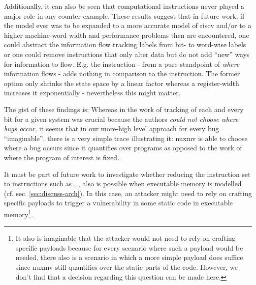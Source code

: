 Additionally, it can also be seen that computational instructions never played a major role in any counter-example.
These results suggest that in future work, if the model ever was to be expanded to a more accurate model of \gls{riscv} and/or to a higher machine-word width and performance problems then are encountered, one could abstract the information flow tracking labels from bit- to word-wise labels or one could remove instructions that only alter data but do not add \enquote{new} ways for information to flow.
E.g. the  instruction - from a pure standpoint of \textit{where} information flows - adds nothing in comparison to the  instruction.
The former option only shrinks the state space by a linear factor whereas a register-width increases it exponentially - nevertheless this might matter.

The gist of these findings is:
Whereas in the work of \citeauthor{Ferraiuolo17} \cite{Ferraiuolo17} tracking of each and every bit for a given system was crucial because the authors \textit{could not choose where bugs occur}, it seems that in our more-high level approach for every bug \enquote{imaginable}, there is a very simple trace illustrating it: \gls{nuxmv} is able to choose where a bug occurs since it quantifies over programs as opposed to the work of \citeauthor{Ferraiuolo17} where the program of interest is fixed.

It must be part of future work to investigate whether reducing the instruction set to instructions such as , ,  also is possible when executable memory is modelled (cf. sec. \ref{sec:discuss-arch}).
In this case, an attacker might need to rely on crafting specific payloads to trigger a vulnerability in some static code in executable memory\footnote{%
    It also is imaginable that the attacker would not need to rely on crafting specific payloads because for every scenario where such a payload would be needed, there also is a scenario in which a more simple payload does suffice since \gls{nuxmv} still quantifies over the static parts of the code.
    However, we don't find that a decision regarding this question can be made here.
}.
